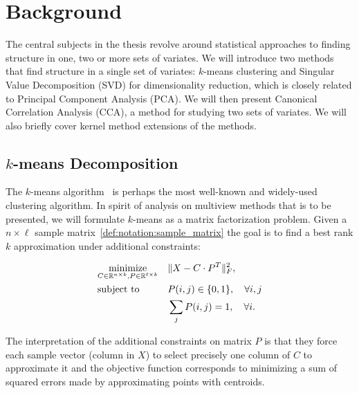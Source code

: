 %
\chapter{Background}\label{chap:background}

The central subjects in the thesis revolve around statistical approaches to finding structure in one, two or more sets of variates. We will
introduce two methods that find structure in a single set of variates: $k$-means clustering and Singular Value Decomposition (SVD) for dimensionality reduction, which is closely related to Principal Component Analysis (PCA). We will then present Canonical Correlation Analysis (CCA), a method for studying two sets of variates. We will also briefly cover kernel method extensions of the methods.


\section{$k$-means Decomposition}\label{chap:background:kmeans}

The $k$-means algorithm~\cite{kmeans} is perhaps the most well-known and widely-used clustering algorithm. In spirit of analysis on multiview methods that is to be presented, we will formulate $k$-means as a matrix factorization problem. Given a $n \times \ell$ sample matrix~\ref{def:notation:sample_matrix}
the goal is to find a best rank $k$ approximation under additional constraints:

\begin{equation}\label{eq:background:kmeans:opt}
\begin{aligned}
& \underset{C \in \mathbb{R}^{n \times k}, P \in \mathbb{R}^{\ell \times k}}{\text{minimize}}
& & \lVert X - C \cdot P^T\rVert_F^2, \\
& \text{subject to}
& & P(i,j) \in \{0,1\}, \quad \forall i,j \\
& & & \sum_j P(i, j) = 1, \quad \forall i.
\end{aligned}
\end{equation}

The interpretation of the additional constraints on matrix $P$ is that they force each sample vector
(column in $X$) to select precisely one column of $C$ to approximate it and the objective function
corresponds to minimizing a sum of squared errors made by approximating points with centroids.

